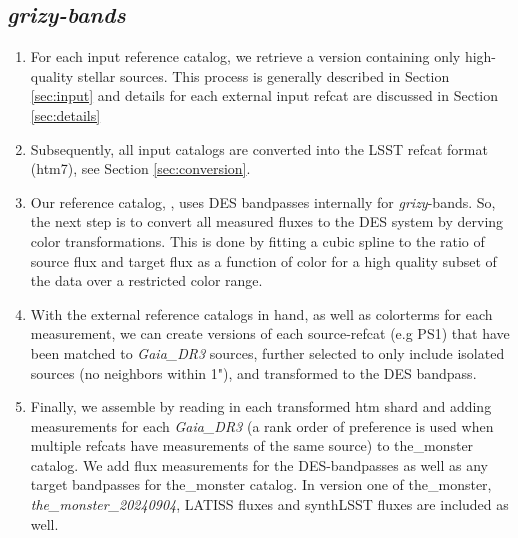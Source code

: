 \subsection{\textit{grizy-bands}}
\begin{enumerate}
    \item For each input reference catalog, we retrieve a version containing only high-quality stellar sources. This process is generally described in Section \ref{sec:input} and details for each external input refcat are discussed in Section \ref{sec:details}
    \item Subsequently, all input catalogs are converted into the LSST refcat format (htm7), see Section \ref{sec:conversion}.
    \item Our reference catalog, \monster, uses DES bandpasses internally for \textit{grizy}-bands. So, the next step is to convert all measured fluxes to the DES system by derving color transformations.
    This is done by fitting a cubic spline to the ratio of source flux and target flux as a function of color for a high quality subset of the data over a restricted color range.
    \item With the external reference catalogs in hand, as well as colorterms for each measurement, we can create versions of each source-refcat (e.g PS1) that have been matched to \textit{Gaia\_DR3} sources, further selected to only include isolated sources (no neighbors within 1"), and transformed to the DES bandpass.
    \item Finally, we assemble \monster by reading in each transformed htm shard and adding measurements for each \textit{Gaia\_DR3} (a rank order of preference is used when multiple refcats have measurements of the same source) to the\_monster catalog. 
    We add flux measurements for the DES-bandpasses as well as any target bandpasses for the\_monster catalog. In version one of the\_monster, \textit{the\_monster\_20240904}, LATISS fluxes and synthLSST fluxes are included as well.
\end{enumerate}

